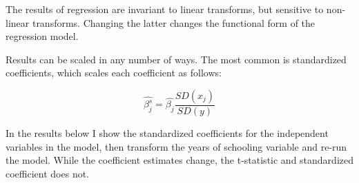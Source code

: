 \documentclass[12pt]{article}
\begin{document}
The results of regression are invariant to linear transforms, but
sensitive to non-linear transforms. Changing the latter changes the
functional form of the regression model.

Results can be scaled in any number of ways. The most common is
standardized coefficients, which scales each coefficient as follows:

\begin{equation*}
  \hat{\beta_j^s}=\hat{\beta_j}\frac{SD(x_j)}{SD(y)}
\end{equation*}

In the results below I show the standardized coefficients for the
independent variables in the model, then transform the years of
schooling variable and re-run the model. While the coefficient
estimates change, the t-statistic and standardized coefficient does
not. 
\end{document}
